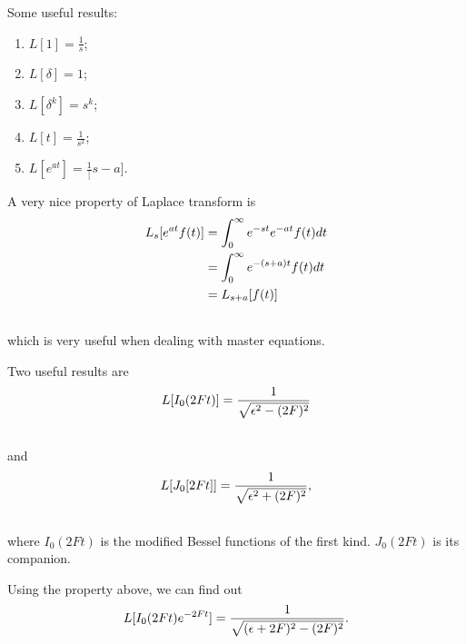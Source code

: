 \documentclass[letterpaper,10pt,english]{sphinxmanual}
\begin{document}
Some useful results:
\begin{enumerate}
\item {} 
$L[1] = \frac{1}{s}$;

\item {} 
$L[\delta] = 1$;

\item {} 
$L[\delta^k] = s^k$;

\item {} 
$L[t] = \frac{1}{s^2}$;

\item {} 
$L[e^{at}]= \frac{1}[s-a]$.

\end{enumerate}

A very nice property of Laplace transform is
\begin{gather}
\begin{split}L_s [e^{at}f(t)] &= \int_0^\infty e^{-st} e^{-at} f(t) dt \\
& =  \int_0^\infty e^{-(s+a)t}f(t) dt \\
& = L_{s+a}[f(t)]\end{split}\notag\\\begin{split}\end{split}\notag
\end{gather}
which is very useful when dealing with master equations.

Two useful results are
\begin{gather}
\begin{split}L[I_0(2Ft)] = \frac{1}{\sqrt{ \epsilon^2 - (2F)^2 }}\end{split}\notag\\\begin{split}\end{split}\notag
\end{gather}
and
\begin{gather}
\begin{split}L[J_0[2Ft]]  = \frac{1}{\sqrt{\epsilon^2 + (2F)^2}},\end{split}\notag\\\begin{split}\end{split}\notag
\end{gather}
where $I_0(2Ft)$ is the modified Bessel functions of the first kind. $J_0(2Ft)$ is its companion.

Using the property above, we can find out
\begin{gather}
\begin{split}L[I_0(2Ft)e^{-2Ft}]  = \frac{1}{\sqrt{(\epsilon + 2F)^2 - (2F)^2}} .\end{split}\notag\\\begin{split}\end{split}\notag
\end{gather}
\end{document}
